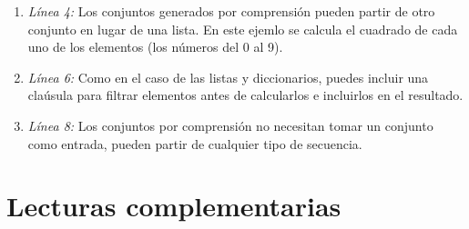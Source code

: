 \begin{enumerate}

\item \emph{Línea 4:} Los conjuntos generados por comprensión pueden partir de otro conjunto en lugar de una lista. En este ejemlo se calcula el cuadrado de cada uno de los elementos (los números del 0 al 9).

\item \emph{Línea 6:} Como en el caso de las listas y diccionarios, puedes incluir una claúsula  para filtrar elementos antes de calcularlos e incluirlos en el resultado.

\item \emph{Línea 8:} Los conjuntos por comprensión no necesitan tomar un conjunto como entrada, pueden partir de cualquier tipo de secuencia.

\end{enumerate}

\section{Lecturas complementarias}

